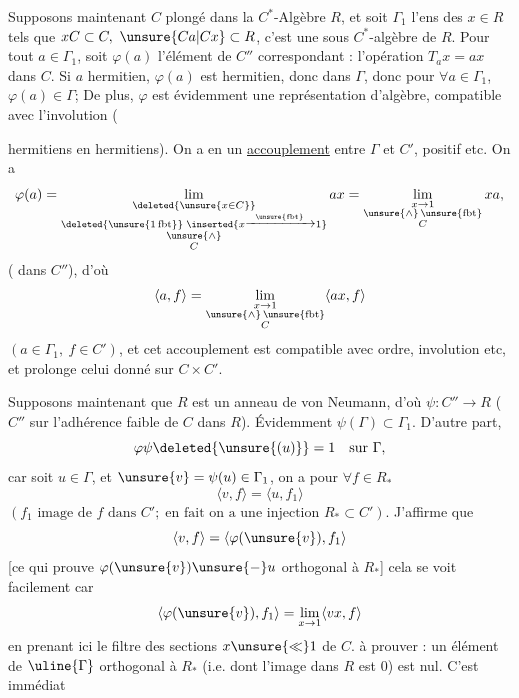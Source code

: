 Supposons maintenant \(C\) plongé dans la \(C^*\)-Algèbre \(R\), et soit \(\Gamma_1\) l'ens des \(x\in R\) tels que \(xC\subset C,\ \unsure{Ca|Cx}\subset R\), c'est une sous \(C^*\)-algèbre de \(R\). Pour tout \(a\in\Gamma_1\), soit \(\varphi(a)\) l'élément de \(C''\) correspondant : l'opération \(T_a x=ax\) dans \(C\). Si \(a\) hermitien, \(\varphi(a)\) est hermitien, donc dans \(\Gamma\), donc pour \(\forall a\in\Gamma_1\), \(\varphi(a)\in\Gamma\); De plus, \(\varphi\) est évidemment une représentation d'algèbre, compatible avec l'involution (


 hermitiens en hermitiens). On a en  un \uline{accouplement} entre \(\Gamma\) et \(C'\), positif etc. On a
\[
\varphi(a)=\lim_{\substack{\deleted{\unsure{x\in C}}\\\deleted{\unsure{1\,\mathrm{fbt}}}\;\inserted{x\xrightarrow{\unsure{\mathrm{fbt}}}1}\\\unsure{\wedge}\\C}}ax
=\lim_{\substack{x\to1\\\unsure{\wedge}\,\unsure{\mathrm{fbt}}\\C}}xa,
\]
( dans \(C''\)), d'où 
\[
\langle a,f\rangle=\lim_{\substack{x\to1\\\unsure{\wedge}\,\unsure{\mathrm{fbt}}\\C}}\langle ax,f\rangle
\]
\((a\in\Gamma_1,\ f\in C')\), et cet accouplement est compatible avec ordre, involution etc, et prolonge celui donné sur \(C\times C'\).

Supposons maintenant que \(R\) est un anneau de von Neumann, d'où  \(\psi:C''\to R\) ( \(C''\) sur l'adhérence faible de \(C\) dans \(R\)). Évidemment \(\psi(\Gamma)\subset\Gamma_1\). D'autre part,
\[
\varphi\psi\deleted{\unsure{(u)}}=1\quad\text{sur }\Gamma,
\]
car soit \(u\in\Gamma\),  et \(\unsure{v}=\psi(u)\in\Gamma_1\), on a pour \(\forall f\in R_*\)
\[
\langle v,f\rangle=\langle u,f_1\rangle
\]
\((f_1\text{ image de }f\text{ dans }C';\;\text{en fait on a une injection }R_*\subset C')\).
J'affirme que
\[
\langle v,f\rangle=\langle\varphi(\unsure{v}),f_1\rangle
\]
[ce qui prouve  \(\varphi(\unsure{v})\unsure{-}u\) orthogonal à \(R_*\)] cela se voit facilement car
\[
\langle\varphi(\unsure{v}),f_1\rangle=\lim_{x\to1}\langle vx,f\rangle
\]
en prenant ici le filtre des sections  \(x\unsure{\ll}1\) de \(C\).  à prouver : un élément de \(\uline{\Gamma}\) orthogonal à \(R_*\)  (i.e. dont l'image dans \(R\) est \(0\)) est nul. C'est immédiat

